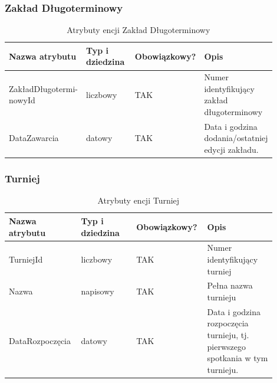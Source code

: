 \documentclass{mwrep}[15pt]
\begin{document}
\vspace{1cm}

\subsubsection{Zakład Długoterminowy}
\begin{table}[H]
	\begin{tabular}{|p{0.25\linewidth}|p{0.2\linewidth}|p{0.2\linewidth}|p{0.25\linewidth}|}
	\hline
	Nazwa atrybutu & Typ i dziedzina & Obowiązkowy? & Opis                                                           \\ \hline
	ZakładDługotermi- nowyId   & liczbowy                            & TAK                              & Numer identyfikujący zakład długoterminowy                                                  \\ \hline
	DataZawarcia          & datowy                            & TAK                              & Data i godzina dodania/ostatniej edycji zakładu.       \\ \hline
	\end{tabular}
	\caption{Atrybuty encji Zakład Długoterminowy}
\end{table}

\newpage

\subsubsection{Turniej}
\begin{table}[H]
	\begin{tabular}{|p{0.25\linewidth}|p{0.2\linewidth}|p{0.2\linewidth}|p{0.25\linewidth}|}
	\hline
	Nazwa atrybutu & Typ i dziedzina & Obowiązkowy? & Opis                                                           \\ \hline
	TurniejId   & liczbowy                            & TAK                              & Numer identyfikujący turniej  \\ \hline
	Nazwa   & napisowy                            & TAK                              & Pełna nazwa turnieju  \\ \hline
	DataRozpoczęcia          & datowy                            & TAK                              & Data i godzina rozpoczęcia turnieju, tj. pierwszego spotkania w tym turnieju.       \\ \hline
	\end{tabular}
	\caption{Atrybuty encji Turniej}
\end{table}
\end{document}
